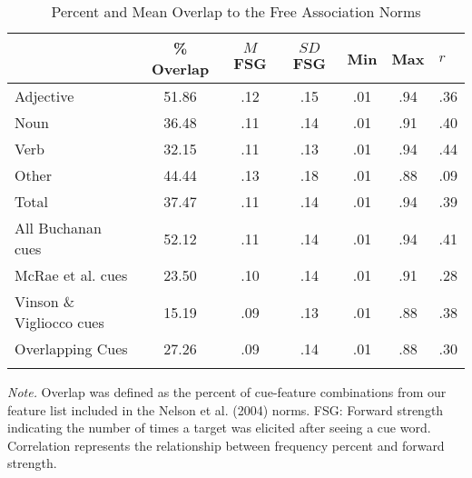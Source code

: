 \documentclass[english,,man]{apa6}
\begin{document}
\begin{table}[tbp]
\begin{center}
\begin{threeparttable}
\caption{\label{tab:divergent-table}Percent and Mean Overlap to the Free Association Norms}
\begin{tabular}{lcccccl}
\toprule
  & \% Overlap & $M$ FSG & $SD$ FSG & Min & Max & $r$\\
\midrule
Adjective & 51.86 & .12 & .15 & .01 & .94 & .36\\
Noun & 36.48 & .11 & .14 & .01 & .91 & .40\\
Verb & 32.15 & .11 & .13 & .01 & .94 & .44\\
Other & 44.44 & .13 & .18 & .01 & .88 & .09\\
Total & 37.47 & .11 & .14 & .01 & .94 & .39\\
All Buchanan cues & 52.12 & .11 & .14 & .01 & .94 & .41\\
McRae et al. cues & 23.50 & .10 & .14 & .01 & .91 & .28\\
Vinson \& Vigliocco cues & 15.19 & .09 & .13 & .01 & .88 & .38\\
Overlapping Cues & 27.26 & .09 & .14 & .01 & .88 & .30\\
\bottomrule
\addlinespace
\end{tabular}
\begin{tablenotes}[para]
\normalsize{\textit{Note.} Overlap was defined as the percent of cue-feature combinations from our feature list included in the Nelson et al. (2004) norms. FSG: Forward strength indicating the number of times a target was elicited after seeing a cue word. Correlation represents the relationship between frequency percent and forward strength.}
\end{tablenotes}
\end{threeparttable}
\end{center}
\end{table}
\end{document}
